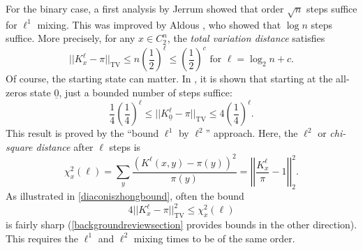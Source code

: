 \documentclass[11pt]{article}
\newcounter{r}
\newcounter{s}
\numberwithin{equation}{section}
\begin{document}
For the binary case, a first analysis by Jerrum \cite{jerrum} showed that order $\sqrt{n}$ steps suffice for $\ell^1$ mixing. This was improved by Aldous \cite{aldousfill}, who showed that $\log n$ steps suffice. More precisely, for any $x \in C_2^n$, the \textit{total variation distance} satisfies
\begin{equation}\label{aldousbound}
    ||K_x^\ell - \pi||_{\text{TV}} \le n\left(\frac{1}{2}\right)^\ell \le \left(\frac{1}{2}\right)^c \text{ for } \ell = \log_2n + c.
\end{equation}
Of course, the starting state can matter. In \cite{diaconiszhong}, it is shown that starting at the all-zeros state $\underline{0}$, just a bounded number of steps suffice:
\begin{equation}\label{diaconiszhongbound}
    \frac{1}{4}\left(\frac{1}{4}\right)^\ell \le ||K_{\underline{0}}^\ell - \pi||_{\text{TV}} \le 4\left(\frac{1}{4}\right)^\ell.
\end{equation}
This result is proved by the ``bound $\ell^1$ by $\ell^2$'' approach. Here, the $\ell^2$ or \textit{chi-square distance} after $\ell$ steps is
\[
    \chi_x^2(\ell) = \sum_y \frac{(K^\ell(x, y) - \pi(y))^2}{\pi(y)} = \left|\left|\frac{K_x^\ell}{\pi} - 1\right|\right|_2^2.
\]  
As illustrated in \cref{diaconiszhongbound}, often the bound
\[
    4||K_x^\ell - \pi||_{\text{TV}}^2 \le \chi_x^2(\ell)
\]
is fairly sharp (\cref{backgroundreviewsection} provides bounds in the other direction). This requires the $\ell^1$ and $\ell^2$ mixing times to be of the same order.
\end{document}
